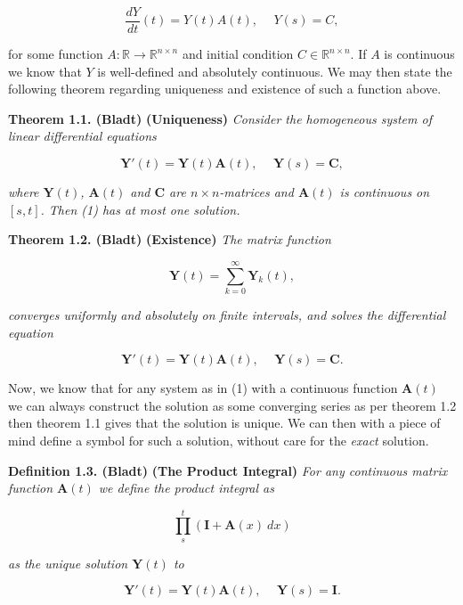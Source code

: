 \documentclass[a4paper,12pt,openany]{book}
\begin{document}
\[
\frac{dY}{dt}(t)=Y(t)A(t),\hspace{15pt}Y(s)=C,
\]

for some function \(A : \mathbb{R}\to\mathbb{R}^{n\times n}\) and initial condition \(C\in \mathbb{R}^{n\times n}\). If \(A\) is continuous we know that \(Y\) is well-defined and absolutely continuous. We may then state the following theorem regarding uniqueness and existence of such a function above.

\textbf{Theorem 1.1. (Bladt)} \textbf{(Uniqueness)} \emph{Consider the homogeneous system of linear differential equations}

\[
\mathbf{Y}'(t)=\mathbf{Y}(t)\mathbf{A}(t),\hspace{15pt} \mathbf{Y}(s)=\mathbf{C},\tag{1}
\]

\emph{where \(\mathbf{Y}(t)\), \(\mathbf{A}(t)\) and \(\mathbf{C}\) are \(n\times n\)-matrices and \(\mathbf{A}(t)\) is continuous on \([s,t]\). Then (1) has at most one solution.}

\textbf{Theorem 1.2. (Bladt)} \textbf{(Existence)} \emph{The matrix function}

\[
\mathbf{Y}(t)=\sum_{k=0}^\infty \mathbf{Y}_k(t),\tag{3}
\]

\emph{converges uniformly and absolutely on finite intervals, and solves the differential equation}

\[
\mathbf{Y}'(t)=\mathbf{Y}(t)\mathbf{A}(t),\hspace{15pt} \mathbf{Y}(s)=\mathbf{C}.
\]

Now, we know that for any system as in (1) with a continuous function \(\mathbf{A}(t)\) we can always construct the solution as some converging series as per theorem 1.2 then theorem 1.1 gives that the solution is unique. We can then with a piece of mind define a symbol for such a solution, without care for the \emph{exact} solution.

\textbf{Definition 1.3. (Bladt)} \textbf{(The Product Integral)} \emph{For any continuous matrix function \(\mathbf{A}(t)\) we define the product integral as}

\[
\prod_{s}^t(\mathbf{I}+\mathbf{A}(x)\ dx)
\]

\emph{as the unique solution \(\mathbf{Y}(t)\) to}

\[
\mathbf{Y}'(t)=\mathbf{Y}(t)\mathbf{A}(t),\hspace{15pt} \mathbf{Y}(s)=\mathbf{I}.
\]
\end{document}
